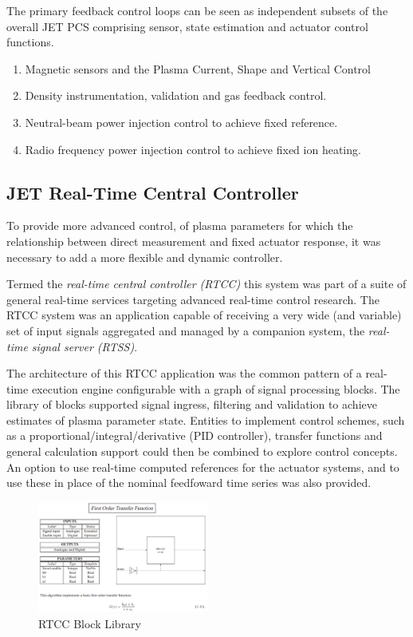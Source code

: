 \documentclass[5p]{elsarticle}
\begin{document}
\label{s_primary_fb}

The primary feedback control loops can be seen as independent subsets of the overall JET PCS
comprising sensor, state estimation and actuator control functions.

\begin{enumerate}
	\item{Magnetic sensors and the Plasma Current, Shape and Vertical Control}
	\item{Density instrumentation, validation and gas feedback control.}
	\item{Neutral-beam power injection control to achieve fixed reference.}
	\item{Radio frequency power injection control to achieve fixed ion heating.}
\end{enumerate}

\subsection{JET Real-Time Central Controller}
\label{s_rtcc}

To provide more advanced control, of plasma parameters for which the
relationship between direct measurement and fixed actuator response, 
it was necessary to add a more flexible and dynamic controller.

Termed the {\em real-time central controller (RTCC)} this system was
part of a suite of general real-time services targeting advanced
real-time control research.  The RTCC system was an application 
capable of receiving a very wide (and variable) set of input signals
aggregated and managed by a companion system, the {\em real-time signal server (RTSS)}.

The architecture of this RTCC application was the common pattern of
a real-time execution engine configurable with a graph of signal
processing blocks.  The library of blocks supported signal ingress,
filtering and validation to achieve estimates of plasma parameter
state.  Entities to implement control schemes, such as a proportional/integral/derivative
(PID controller), transfer functions and general calculation support
could then be combined to explore control concepts.  An option to
use real-time computed references for the actuator systems, and to 
use these in place of the nominal feedfoward time series was also
provided.

\begin{figure}[ht!]%
\centering
	\includegraphics[width=0.5\textwidth]{RTCC_TF1_BLOCK.PNG}
\caption{RTCC Block Library}\label{fig2}
\end{figure}
\end{document}

